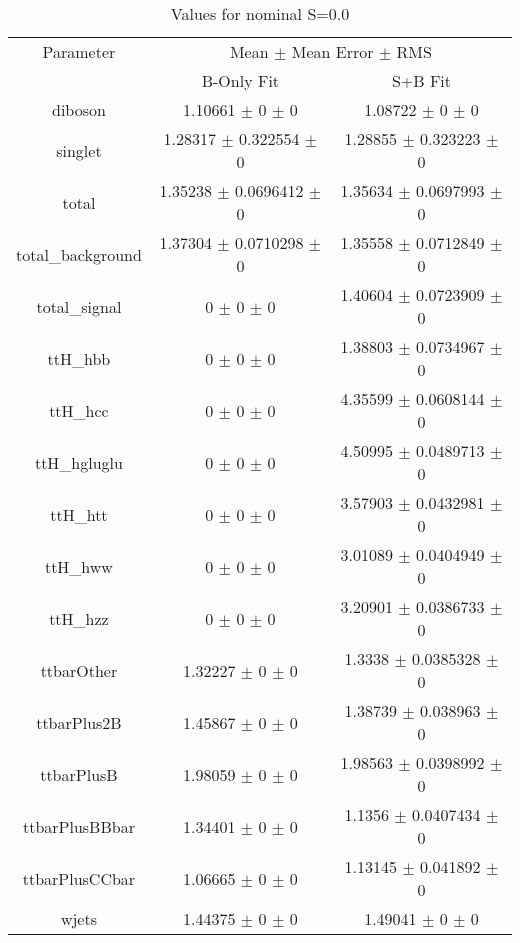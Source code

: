 \begin{table}
\centering
\caption{Values for nominal S=0.0}
\begin{tabular}{ccc}
\toprule
Parameter & \multicolumn{2}{c}{Mean $\pm$ Mean Error $\pm$ RMS}\\
 & B-Only Fit & S+B Fit\\
\midrule
diboson & \num{1.10661} $\pm$ \num{0} $\pm$ \num{0} & \num{1.08722} $\pm$ \num{0} $\pm$ \num{0}\\
singlet & \num{1.28317} $\pm$ \num{0.322554} $\pm$ \num{0} & \num{1.28855} $\pm$ \num{0.323223} $\pm$ \num{0}\\
total & \num{1.35238} $\pm$ \num{0.0696412} $\pm$ \num{0} & \num{1.35634} $\pm$ \num{0.0697993} $\pm$ \num{0}\\
total\_background & \num{1.37304} $\pm$ \num{0.0710298} $\pm$ \num{0} & \num{1.35558} $\pm$ \num{0.0712849} $\pm$ \num{0}\\
total\_signal & \num{0} $\pm$ \num{0} $\pm$ \num{0} & \num{1.40604} $\pm$ \num{0.0723909} $\pm$ \num{0}\\
ttH\_hbb & \num{0} $\pm$ \num{0} $\pm$ \num{0} & \num{1.38803} $\pm$ \num{0.0734967} $\pm$ \num{0}\\
ttH\_hcc & \num{0} $\pm$ \num{0} $\pm$ \num{0} & \num{4.35599} $\pm$ \num{0.0608144} $\pm$ \num{0}\\
ttH\_hgluglu & \num{0} $\pm$ \num{0} $\pm$ \num{0} & \num{4.50995} $\pm$ \num{0.0489713} $\pm$ \num{0}\\
ttH\_htt & \num{0} $\pm$ \num{0} $\pm$ \num{0} & \num{3.57903} $\pm$ \num{0.0432981} $\pm$ \num{0}\\
ttH\_hww & \num{0} $\pm$ \num{0} $\pm$ \num{0} & \num{3.01089} $\pm$ \num{0.0404949} $\pm$ \num{0}\\
ttH\_hzz & \num{0} $\pm$ \num{0} $\pm$ \num{0} & \num{3.20901} $\pm$ \num{0.0386733} $\pm$ \num{0}\\
ttbarOther & \num{1.32227} $\pm$ \num{0} $\pm$ \num{0} & \num{1.3338} $\pm$ \num{0.0385328} $\pm$ \num{0}\\
ttbarPlus2B & \num{1.45867} $\pm$ \num{0} $\pm$ \num{0} & \num{1.38739} $\pm$ \num{0.038963} $\pm$ \num{0}\\
ttbarPlusB & \num{1.98059} $\pm$ \num{0} $\pm$ \num{0} & \num{1.98563} $\pm$ \num{0.0398992} $\pm$ \num{0}\\
ttbarPlusBBbar & \num{1.34401} $\pm$ \num{0} $\pm$ \num{0} & \num{1.1356} $\pm$ \num{0.0407434} $\pm$ \num{0}\\
ttbarPlusCCbar & \num{1.06665} $\pm$ \num{0} $\pm$ \num{0} & \num{1.13145} $\pm$ \num{0.041892} $\pm$ \num{0}\\
wjets & \num{1.44375} $\pm$ \num{0} $\pm$ \num{0} & \num{1.49041} $\pm$ \num{0} $\pm$ \num{0}\\
\bottomrule
\end{tabular}
\end{table}